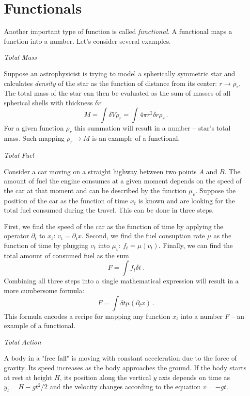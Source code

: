 \section{Functionals}
Another important type of function is called \emph{functional}. A functional maps a function into a number. Let's consider several examples.

\begin{flushleft}
	{\it Total Mass}
\end{flushleft}
Suppose an astrophysicist is trying to model a spherically symmetric star and calculates \emph{density} of the star as the function of distance from its center: $r\rightarrow\rho_r$. The total mass of the star can then be evaluated as the sum of masses of all spherical shells with thickness $\delta r$:
\[
M = \int \delta V\rho_r=\int 4\pi r^2\delta r\rho_r\,.
\]
For a given function $\rho_r$ this summation will result in a number -- star's total mass. Such mapping $\rho_r\rightarrow M$ is an example of a functional.

\begin{flushleft}
	{\it Total Fuel}
\end{flushleft}
Consider a car moving on a straight highway between two points $A$ and $B$. The amount of fuel the engine consumes at a given moment depends on the speed of the car at that moment and can be described by the function $\mu_v$. Suppose the position of the car as the function of time $x_t$ is known and are looking for the total fuel consumed during the travel. This can be done in three steps. 

First, we find the speed of the car as the function of time by applying the operator $\partial_t$ to $x_t$: $v_t=\partial_{t}x$. Second, we find the fuel consuption rate $\mu$  as the function of time by plugging $v_t$ into $\mu_v$: $f_t = \mu(v_t)$. Finally, we can find the total amount of consumed fuel as the sum
\[
F = \int f_t\delta t\,.
\]
Combining all three steps into a single mathematical expression will result in a more cumbersome formula:
\[
F = \int \delta t\mu(\partial_t x)\,.
\]
This formula encodes a recipe for mapping any function $x_t$ into a number $F$ -- an example of a functional.

\begin{flushleft}
	{\it Total Action}
\end{flushleft}
A body in a "free fall" is moving with constant acceleration due to the force of gravity. Its speed increases as the body approaches the ground. If the body starts at rest at height $H$, its position along the vertical $y$ axis depends on time as $y_t=H-gt^2/2$ and the velocity changes according to the equation $v=-gt$.

